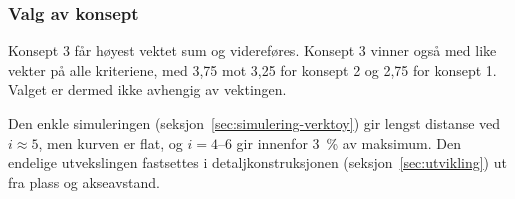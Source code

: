 \subsubsection{Valg av konsept}
Konsept 3 får høyest vektet sum og videreføres. Konsept 3 vinner også med like vekter på alle kriteriene, med 3,75 mot 3,25 for konsept 2 og 2,75 for konsept 1. Valget er dermed ikke avhengig av vektingen.

Den enkle simuleringen (seksjon~\ref{sec:simulering-verktoy}) gir lengst distanse ved $i \approx 5$, men kurven er flat, og $i = 4$--$6$ gir innenfor \SI{3}{\percent} av maksimum. Den endelige utvekslingen fastsettes i detaljkonstruksjonen (seksjon~\ref{sec:utvikling}) ut fra plass og akseavstand.

